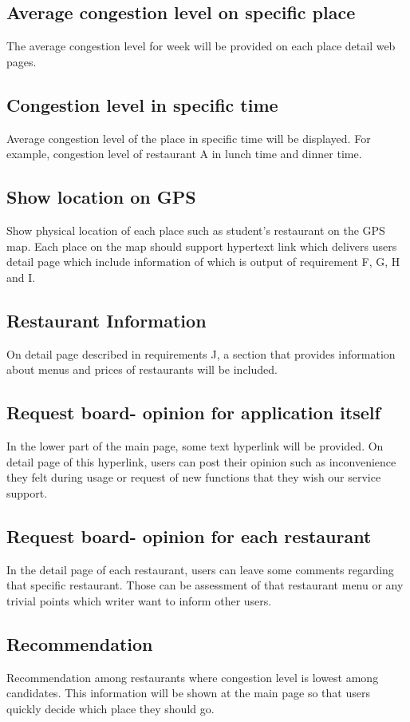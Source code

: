 \documentclass[journal]{IEEEtran}
\begin{document}
\subsection{Average congestion level on specific place}
The average congestion level for week will be provided on each place detail web pages. 
\subsection{Congestion level in specific time}
Average congestion level of the place in specific time will be displayed. For example, congestion level of restaurant A in lunch time and dinner time.
\subsection{Show location on GPS}
Show physical location of each place such as student’s restaurant on the GPS map. Each place on the map should support hypertext link which delivers users detail page which include information of which is output of requirement F, G, H and I.
\subsection{Restaurant Information}
On detail page described in requirements J, a section that provides information about menus and prices of restaurants will be included.
\subsection{Request board- opinion for application itself}
In the lower part of the main page, some text hyperlink will be provided. On detail page of this hyperlink, users can post their opinion such as inconvenience they felt during usage or request of new functions that they wish our service support.
\subsection{Request board- opinion for each restaurant}
In the detail page of each restaurant, users can leave some comments regarding that specific restaurant. Those can be assessment of that restaurant menu or any trivial points which writer want to inform other users.  
\subsection{Recommendation}
Recommendation among restaurants where congestion level is lowest among candidates. This information will be shown at the main page so that users quickly decide which place they should go. 
\end{document}
